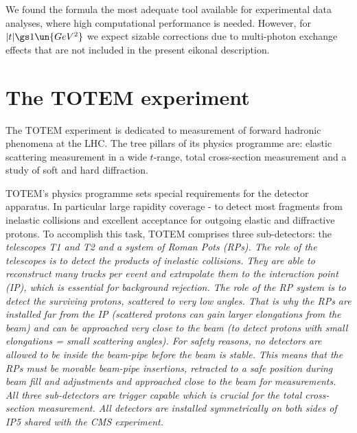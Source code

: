 
We found the \KL{} formula the most adequate tool available for experimental data analyses, where high computational performance is needed. However, for $|t| \gs 1\un{GeV^2}$ we expect sizable corrections due to multi-photon exchange effects that are not included in the present eikonal description.


\chapter[ttm]{The TOTEM experiment}

The TOTEM experiment  is dedicated to measurement of forward hadronic phenomena at the LHC. The tree pillars of its physics programme are: elastic scattering measurement in a wide $t$-range, total cross-section measurement and a study of soft and hard diffraction.

TOTEM's physics programme sets special requirements for the detector apparatus. In particular large rapidity coverage - to detect most fragments from inelastic collisions and excellent acceptance for outgoing elastic and diffractive protons. To accomplish this task, TOTEM comprises three sub-detectors: the \em{telescopes T1 and T2} and a system of \em{Roman Pots} (RPs). The role of the telescopes is to detect the products of inelastic collisions. They are able to reconstruct many tracks per event and extrapolate them to the interaction point (IP), which is essential for background rejection. The role of the RP system is to detect the surviving protons, scattered to very low angles. That is why the RPs are installed far from the IP (scattered protons can gain larger elongations from the beam) and can be approached very close to the beam (to detect protons with small elongations = small scattering angles). For safety reasons, no detectors are allowed to be inside the beam-pipe before the beam is stable. This means that the RPs must be movable beam-pipe insertions, retracted to a safe position during beam fill and adjustments and approached close to the beam for measurements. All three sub-detectors are trigger capable which is crucial for the total cross-section measurement. All detectors are installed symmetrically on both sides of IP5 shared with the CMS experiment.

